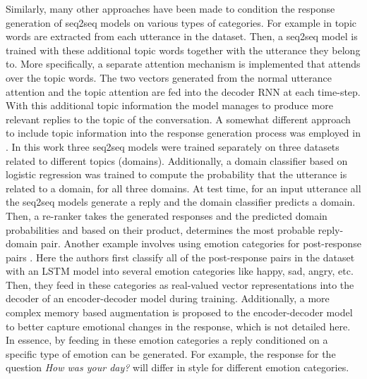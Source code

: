 \documentclass[12pt]{article}
\begin{document}
Similarly, many other approaches have been made to condition the response generation of seq2seq models on various types of categories. For example in \cite{Xing_topic:2017} topic words are extracted from each utterance in the dataset. Then, a seq2seq model is trained with these additional topic words together with the utterance they belong to. More specifically, a separate attention mechanism is implemented that attends over the topic words. The two vectors generated from the normal utterance attention and the topic attention are fed into the decoder RNN at each time-step. With this additional topic information the model manages to produce more relevant replies to the topic of the conversation. A somewhat different approach to include topic information into the response generation process was employed in \cite{Choudhary:2017}. In this work three seq2seq models were trained separately on three datasets related to different topics (domains). Additionally, a domain classifier based on logistic regression was trained to compute the probability that the utterance is related to a domain, for all three domains. At test time, for an input utterance all the seq2seq models generate a reply and the domain classifier predicts a domain. Then, a re-ranker takes the generated responses and the predicted domain probabilities and based on their product, determines the most probable reply-domain pair. Another example involves using emotion categories for post-response pairs \cite{Zhou:2017}. Here the authors first classify all of the post-response pairs in the dataset with an LSTM model into several emotion categories like happy, sad, angry, etc. Then, they feed in these categories as real-valued vector representations into the decoder of an encoder-decoder model during training. Additionally, a more complex memory based augmentation is proposed to the encoder-decoder model to better capture emotional changes in the response, which is not detailed here. In essence, by feeding in these emotion categories a reply conditioned on a specific type of emotion can be generated. For example, the response for the question \textit{How was your day?} will differ in style for different emotion categories.
\end{document}
